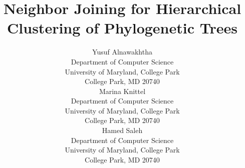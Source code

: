 \documentclass{article}
\title{Neighbor Joining for Hierarchical Clustering of Phylogenetic Trees}
\author{%
  Yusuf Alnawakhtha\\
  Department of Computer Science\\
  University of Maryland, College Park\\
  College Park, MD 20740 \\
  \And
  Marina Knittel \\
  Department of Computer Science\\
  University of Maryland, College Park\\
  College Park, MD 20740 \\
  \And
  Hamed Saleh \\
  Department of Computer Science\\
  University of Maryland, College Park\\
  College Park, MD 20740 \\
}
\begin{document}
\maketitle









\renewcommand\refname{References}
\nocite{*}



\end{document}
